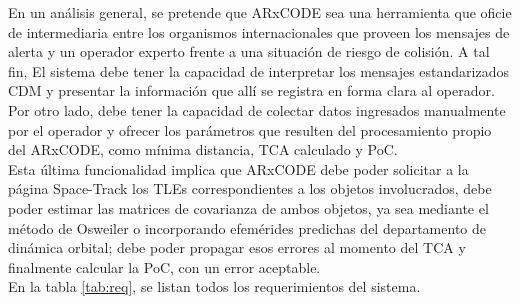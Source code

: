 En un an\'alisis general, se pretende que ARxCODE sea una herramienta que oficie de intermediaria entre los organismos internacionales que proveen los mensajes de alerta y un operador experto frente a una situaci\'on de riesgo de colisi\'on. A tal fin, El sistema debe tener la capacidad de interpretar los mensajes estandarizados CDM y presentar la informaci\'on que all\'i se registra en forma clara al operador.\\
Por otro lado, debe tener la capacidad de colectar datos ingresados manualmente por el operador y ofrecer los par\'ametros que resulten del procesamiento propio del ARxCODE, como m\'inima distancia, TCA calculado y PoC.\\
Esta \'ultima funcionalidad implica que ARxCODE debe poder solicitar a la p\'agina Space-Track los TLEs correspondientes a los objetos involucrados, debe poder estimar las matrices de covarianza de ambos objetos, ya sea mediante el m\'etodo de Osweiler o incorporando efem\'erides predichas del departamento de din\'amica orbital; debe poder propagar esos errores al momento del TCA y finalmente calcular la PoC, con un error aceptable.\\
En la tabla \ref{tab:req}, se listan todos los requerimientos del sistema.\\

